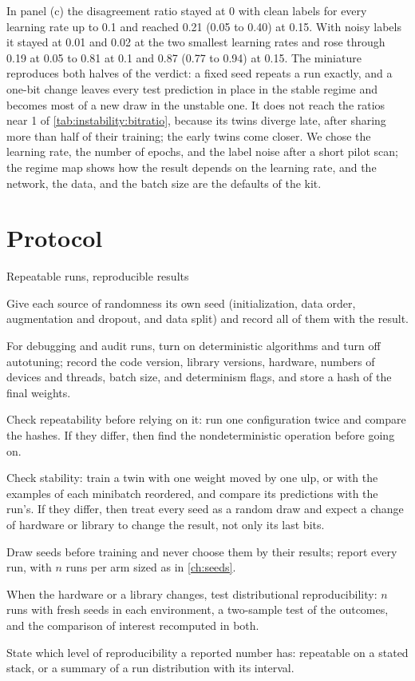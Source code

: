 \begin{refsection}
In panel (c) the disagreement ratio stayed at 0 with clean labels for every learning rate up to 0.1 and reached 0.21 (0.05 to 0.40) at 0.15. With noisy labels it stayed at 0.01 and 0.02 at the two smallest learning rates and rose through 0.19 at 0.05 to 0.81 at 0.1 and 0.87 (0.77 to 0.94) at 0.15. The miniature reproduces both halves of the verdict: a fixed seed repeats a run exactly, and a one-bit change leaves every test prediction in place in the stable regime and becomes most of a new draw in the unstable one. It does not reach the ratios near 1 of \cref{tab:instability:bitratio}, because its twins diverge late, after sharing more than half of their training; the early twins come closer. We chose the learning rate, the number of epochs, and the label noise after a short pilot scan; the regime map shows how the result depends on the learning rate, and the network, the data, and the batch size are the defaults of the kit.

\section{Protocol}\label{sec:instability:protocol}

\begin{protocol}{Repeatable runs, reproducible results}\label{prot:instability:protocol}
\item Give each source of randomness its own seed (initialization, data order, augmentation and dropout, and data split) and record all of them with the result.
\item For debugging and audit runs, turn on deterministic algorithms and turn off autotuning; record the code version, library versions, hardware, numbers of devices and threads, batch size, and determinism flags, and store a hash of the final weights.
\item Check repeatability before relying on it: run one configuration twice and compare the hashes. If they differ, then find the nondeterministic operation before going on.
\item Check stability: train a twin with one weight moved by one ulp, or with the examples of each minibatch reordered, and compare its predictions with the run's. If they differ, then treat every seed as a random draw and expect a change of hardware or library to change the result, not only its last bits.
\item Draw seeds before training and never choose them by their results; report every run, with $n$ runs per arm sized as in \cref{ch:seeds}.
\item When the hardware or a library changes, test distributional reproducibility: $n$ runs with fresh seeds in each environment, a two-sample test of the outcomes, and the comparison of interest recomputed in both.
\item State which level of reproducibility a reported number has: repeatable on a stated stack, or a summary of a run distribution with its interval.
\end{protocol}


\end{refsection}
